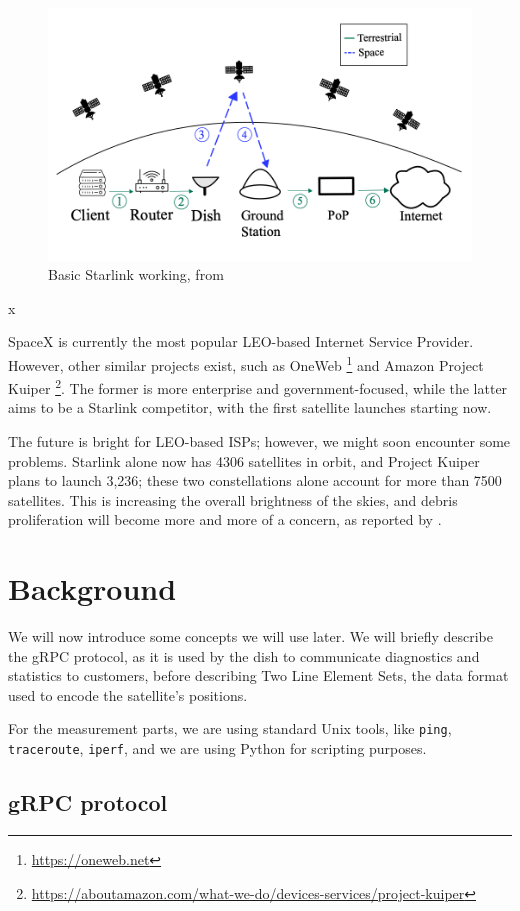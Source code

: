 \documentclass[IN,11pt,twoside,openright,idp,english]{tumthesis}
\begin{document}
\begin{figure}
    \centering
    \includegraphics[width=0.6\columnwidth]{img/starlink-101.png}
    \caption{Basic Starlink working, from \cite{izhikevich2023democratizing}}
    \label{fig:starlink-101}
\end{figure}x       
    
SpaceX is currently the most popular LEO-based Internet Service Provider. However, other similar projects exist, such as OneWeb \footnote{\url{https://oneweb.net}} and Amazon Project Kuiper \footnote{\url{https://aboutamazon.com/what-we-do/devices-services/project-kuiper}}. The former is more enterprise and government-focused, while the latter aims to be a Starlink competitor, with the first satellite launches starting now.

The future is bright for LEO-based ISPs; however, we might soon encounter some problems. Starlink alone now has 4306 satellites in orbit, and Project Kuiper plans to launch 3,236; these two constellations alone account for more than 7500 satellites. This is increasing the overall brightness of the skies, and debris proliferation will become more and more of a concern, as reported by \cite{cite-key}.
    
\section{Background}

We will now introduce some concepts we will use later. We will briefly describe the gRPC protocol, as it is used by the dish to communicate diagnostics and statistics to customers, before describing Two Line Element Sets, the data format used to encode the satellite's positions. 

For the measurement parts, we are using standard Unix tools, like \texttt{ping}, \texttt{traceroute}, \texttt{iperf}, and we are using Python for scripting purposes.
    
\subsection{gRPC protocol}
    
\end{document}
